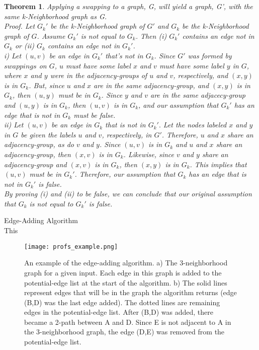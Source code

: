 \documentclass[11pt]{article}
\newtheorem{thm}{Theorem}[section]
\begin{document}
\begin{thm}  \emph{Applying a swapping to a graph, G, will yield a graph, G', with the same k-Neighborhood graph as G.}\\
\noindent \emph{Proof.} Let $G_k'$ be the k-Neighborhood graph of $G'$ and $G_k$ be the k-Neighborhood graph of $G$. Assume $G_k'$ is not equal to $G_k$. Then (i) $G_k'$ contains an edge not in $G_k$ or (ii) $G_k$ contains an edge not in $G_k'$.  \\
\indent i) Let $(u,v)$ be an edge in $G_k'$ that's not in $G_k$. Since $G'$ was formed by $swappings$ on $G$, $u$ must have some label $x$ and $v$ must have some label $y$ in $G$, where $x$ and $y$ were in the adjacency-groups of $u$ and $v$, respectively, and $(x,y)$ is in $G_k$. But, since $u$ and $x$ are in the same adjacency-group, and $(x,y)$ is in $G_k$, then $(u,y)$ must be in $G_k$. Since $y$ and $v$ are in the same adjacecy-group and $(u,y)$ is in $G_k$, then $(u,v)$ is in $G_k$, and our assumption that $G_k'$ has an edge that is not in $G_k$ must be false.\\
\indent 			ii) Let $(u,v)$ be an edge in $G_k$ that is not in $G_k'.$ Let the nodes labeled $x$ and $y$ in $G$ be given the labels $u$ and $v$, respectively, in $G'$. Therefore, $u$ and $x$ share an adjacency-group, as do $v$ and $y$.  Since $(u,v)$ is in $G_k$ and $u$ and $x$ share an adjacency-group, then $(x,v)$ is in $G_k$. Likewise, since $v$ and $y$ share an adjacency-group and $(x,v)$ is in $G_k$, then $(x,y)$ is in $G_k$. This implies that $(u,v)$ must be in $G_k'$. Therefore, our assumption that $G_k$ has an edge that is not in $G_k'$ is false. \\
By proving (i) and (ii) to be false, we can conclude that our original assumption that $G_k$ is not equal to $G_k'$ is false.\\
\end{thm}

 Edge-Adding Algorithm\\
This 

\begin{figure}[htb]
\centering
\texttt{[image: profs\_example.png]}
\caption{An example of the edge-adding algorithm. a) The 3-neighborhood graph for a given input. Each edge in this graph is added to the potential-edge list at the start of the algorithm. b) The solid lines represent edges that will be in the graph the algorithm returns (edge (B,D) was the last edge added). The dotted lines are remaining edges in the potential-edge list. After (B,D) was added, there became a 2-path between A and D. Since E is not adjacent to A in the 3-neighborhood graph, the edge (D,E) was removed from the potential-edge list.}
\label{fig:profs example}
\end{figure}
\end{document}
